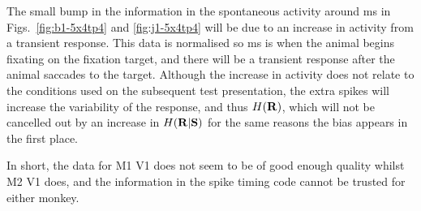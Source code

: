 The small bump in the information in the spontaneous activity around \unit[50]{ms} in Figs.~\ref{fig:b1-5x4tp4} and \ref{fig:j1-5x4tp4} will be due to an increase in activity from a transient response.
This data is normalised so \unit[0]{ms} is when the animal begins fixating on the fixation target, and there will be a transient response after the animal saccades to the target.
Although the increase in activity does not relate to the conditions used on the subsequent test presentation, the extra spikes will increase the variability of the response, and thus $H(\mathbf{R})$, which will not be cancelled out by an increase in $H(\mathbf{R}|\mathbf{S})$ for the same reasons the bias appears in the first place.

In short, the data for \ac{M1} \ac{V1} does not seem to be of good enough quality whilst \ac{M2} \ac{V1} does, and the information in the spike timing code cannot be trusted for either monkey.




